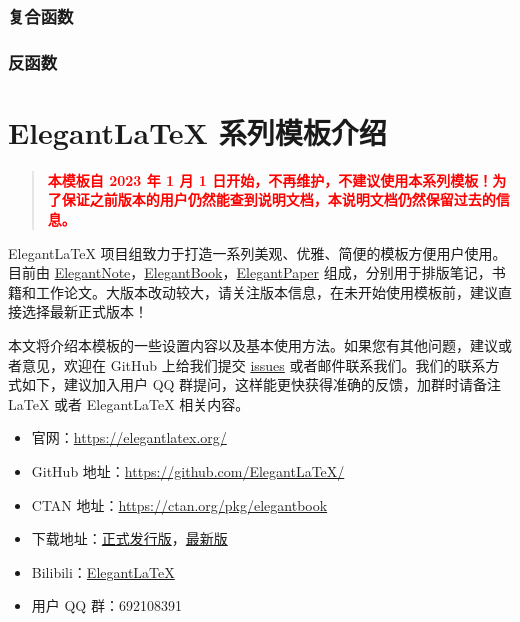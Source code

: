 \documentclass[lang=cn,newtx,10pt,scheme=chinese]{elegantbook}
\begin{document}
\subsection{复合函数}

\subsection{反函数}

\chapter{Elegant\LaTeX{} 系列模板介绍}

\begin{quotation}
  \textbf{\textcolor{red}{本模板自 2023 年 1 月 1 日开始，不再维护，不建议使用本系列模板！为了保证之前版本的用户仍然能查到说明文档，本说明文档仍然保留过去的信息。}}
\end{quotation}

Elegant\LaTeX{} 项目组致力于打造一系列美观、优雅、简便的模板方便用户使用。目前由 \href{https://github.com/ElegantLaTeX/ElegantNote}{ElegantNote}，\href{https://github.com/ElegantLaTeX/ElegantBook}{ElegantBook}，\href{https://github.com/ElegantLaTeX/ElegantPaper}{ElegantPaper} 组成，分别用于排版笔记，书籍和工作论文。大版本改动较大，请关注版本信息，在未开始使用模板前，建议直接选择最新正式版本！


本文将介绍本模板的一些设置内容以及基本使用方法。如果您有其他问题，建议或者意见，欢迎在 GitHub 上给我们提交 \href{https://github.com/ElegantLaTeX/ElegantBook/issues}{issues} 或者邮件联系我们。我们的联系方式如下，建议加入用户 QQ 群提问，这样能更快获得准确的反馈，加群时请备注 \LaTeX{} 或者 Elegant\LaTeX{} 相关内容。
\begin{itemize}
  \item 官网：\href{https://elegantlatex.org/}{https://elegantlatex.org/}
  \item GitHub 地址：\href{https://github.com/ElegantLaTeX/}{https://github.com/ElegantLaTeX/}
  \item CTAN 地址：\href{https://ctan.org/pkg/elegantbook}{https://ctan.org/pkg/elegantbook}
  \item 下载地址：\href{https://github.com/ElegantLaTeX/ElegantBook/releases}{正式发行版}，\href{https://github.com/ElegantLaTeX/ElegantBook/archive/master.zip}{最新版}
  \item Bilibili：\href{https://space.bilibili.com/516479629}{ElegantLaTeX}
  \item 用户 QQ 群：692108391
\end{itemize}
\end{document}
